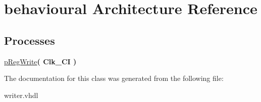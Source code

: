 \hypertarget{classwriter_1_1behavioural}{}\section{behavioural Architecture Reference}
\label{classwriter_1_1behavioural}
\subsection*{Processes}
 \begin{DoxyCompactItemize}
\item 
\mbox{\label{classwriter_1_1behavioural_ad89617b3290d2a8b5abe6d37595ddeaa}} 
\hyperlink{classwriter_1_1behavioural_ad89617b3290d2a8b5abe6d37595ddeaa}{p\+Reg\+Write}{\bfseries  ( {\bfseries \textcolor{vhdlchar}{Clk\+\_\+\+CI}\textcolor{vhdlchar}{ }} )}
\end{DoxyCompactItemize}


The documentation for this class was generated from the following file\+:\begin{DoxyCompactItemize}
\item 
writer.\+vhdl\end{DoxyCompactItemize}
